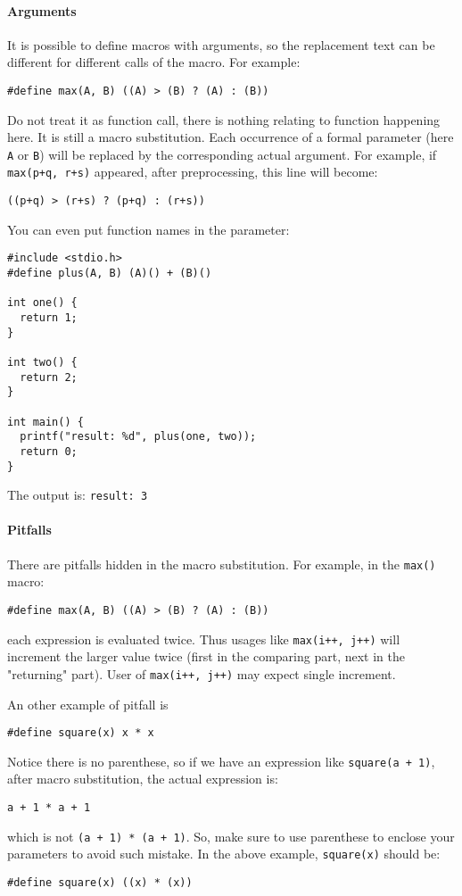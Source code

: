 \documentclass[12pt]{article}
\begin{document}
\paragraph{Arguments}
\label{sec:orge4f632c}
It is possible to define macros with arguments, so the replacement text can be different for different calls of the macro. For example:
\begin{verbatim}
#define max(A, B) ((A) > (B) ? (A) : (B))
\end{verbatim}
Do not treat it as function call, there is nothing relating to function happening here. It is still a macro substitution. Each occurrence of a formal parameter (here \texttt{A} or \texttt{B}) will be replaced by the corresponding actual argument. For example, if \texttt{max(p+q, r+s)} appeared, after preprocessing, this line will become:
\begin{verbatim}
((p+q) > (r+s) ? (p+q) : (r+s))
\end{verbatim}

You can even put function names in the parameter:
\begin{verbatim}
#include <stdio.h>
#define plus(A, B) (A)() + (B)()

int one() {
  return 1;
}

int two() {
  return 2;
}

int main() {
  printf("result: %d", plus(one, two));
  return 0;
}
\end{verbatim}
The output is: \texttt{result: 3}
\paragraph{Pitfalls}
\label{sec:org08c2cf0}
There are pitfalls hidden in the macro substitution. For example, in the \texttt{max()} macro:
\begin{verbatim}
#define max(A, B) ((A) > (B) ? (A) : (B))
\end{verbatim}
each expression is evaluated twice. Thus usages like \texttt{max(i++, j++)} will increment the larger value twice (first in the comparing part, next in the "returning" part). User of \texttt{max(i++, j++)} may expect single increment.

An other example of pitfall is
\begin{verbatim}
#define square(x) x * x
\end{verbatim}
Notice there is no parenthese, so if we have an expression like \texttt{square(a + 1)}, after macro substitution, the actual expression is:
\begin{verbatim}
a + 1 * a + 1
\end{verbatim}
which is not \texttt{(a + 1) * (a + 1)}. So, make sure to use parenthese to enclose your parameters to avoid such mistake. In the above example, \texttt{square(x)} should be:
\begin{verbatim}
#define square(x) ((x) * (x))
\end{verbatim}
\end{document}
